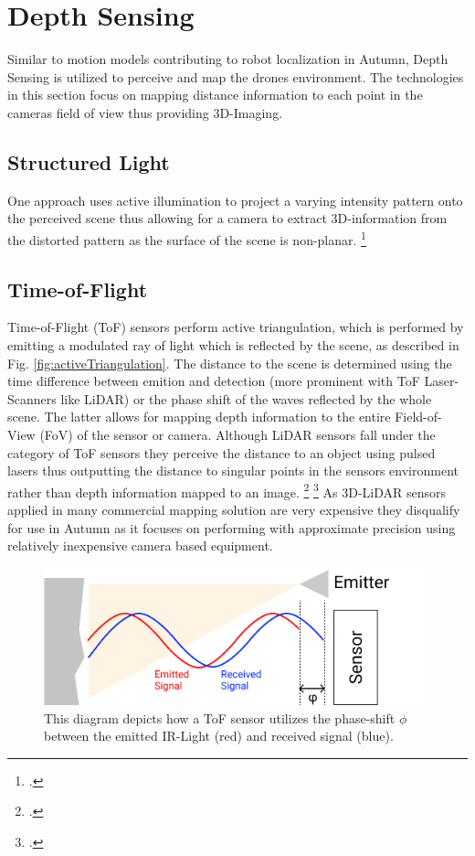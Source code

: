 \section{Depth Sensing}
Similar to motion models contributing to robot localization in Autumn, Depth Sensing is utilized to perceive and map the drones environment. 
The technologies in this section focus on mapping distance information to each point in the cameras field of view thus providing 3D-Imaging.

\subsection{Structured Light}
One approach uses active illumination to project a varying intensity pattern onto the perceived scene thus allowing for a camera to extract 3D-information from the distorted pattern as the surface of the scene is non-planar. \footcite{geng2011StructuredLight}

\subsection{Time-of-Flight}
Time-of-Flight (ToF) sensors perform active triangulation, which is performed by emitting a modulated ray of light which is reflected by the scene, as described in Fig. \ref{fig:activeTriangulation}. The distance to the scene is determined using the time difference between emition and detection (more prominent with ToF Laser-Scanners like LiDAR) or the phase shift of the waves reflected by the whole scene. The latter allows for mapping depth information to the entire Field-of-View (FoV) of the sensor or camera. 
Although LiDAR sensors fall under the category of ToF sensors they perceive the distance to an object using pulsed lasers thus outputting
the distance to singular points in the sensors environment rather than depth information mapped to an image. \footcite{gokturk2004time} \footcite{velodyne2021LiDAR}
As 3D-LiDAR sensors applied in many commercial mapping solution are very expensive they disqualify for use in Autumn as it focuses on performing with approximate precision using relatively inexpensive camera based equipment. 

\begin{figure}
	\centering
	\includegraphics[width=0.8\linewidth]{img/activeTriangulation}
	\caption{
		This diagram depicts how a ToF sensor utilizes the phase-shift $\phi$ between the emitted IR-Light (red) and received signal (blue). 
	}
	\label{fig:activeTriangulatoin}
\end{figure}


